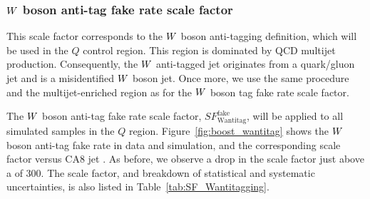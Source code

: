 
\subsubsection{\texorpdfstring{$W$}{W} boson anti-tag fake rate scale factor
\label{sec:wantitag_fake_sf}}

This scale factor corresponds to the $W$ boson anti-tagging definition, which will be used in the
$Q$ control region. This region is dominated by QCD multijet production. Consequently, the $W$
anti-tagged jet originates from a quark/gluon jet and is a misidentified $W$ boson jet. Once
more, we use the same procedure and the multijet-enriched region as for the $W$ boson tag fake
rate scale factor.

The $W$ boson anti-tag fake rate scale factor, $SF_\textrm{Wantitag}^\textrm{fake}$, will be
applied to all simulated samples in the $Q$ region. 
Figure~\ref{fig:boost_wantitag} shows the $W$ boson anti-tag fake rate in data and
simulation, and the corresponding scale factor versus CA8 jet \pt. As before, we observe a drop in
the scale factor just above a \pt of 300\GeV. The scale factor, and breakdown of statistical and
systematic uncertainties, is also listed in Table~\ref{tab:SF_Wantitagging}.


